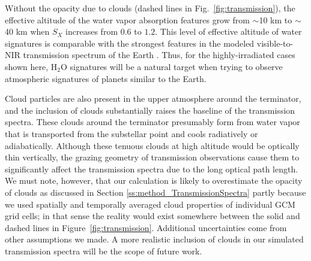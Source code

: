 \documentclass[11pt,numberedappendix,twocolappendix,]{emulateapj}
\def\water{H$_2$O }
\newcommand{\dsa}[1]{{\color{blue}#1}}
\begin{document}
Without the opacity due to clouds (dashed lines in Fig.~\ref{fig:transmission}), the effective altitude of the water vapor absorption features grow from $\sim $10 km to $\sim $40 km when $S_X$ increases from $0.6$ to $1.2$. 
This level of effective altitude of water signatures is comparable with the strongest features in the modeled visible-to-NIR transmission spectrum of the Earth \citep[e.g.,][]{Kaltenegger2009}.
Thus, for the highly-irradiated cases shown here, \water signatures will be a natural target when trying to observe atmospheric signatures of planets similar to the Earth. 

Cloud particles are also present in the upper atmosphere around the terminator, and the inclusion of clouds substantially raises the baseline of the transmission spectra. 
%
These clouds around the terminator presumably form from water vapor that is transported from the substellar point and cools radiatively or adiabatically. 
%
%
Although these tenuous clouds at high altitude would be optically thin vertically, the grazing geometry of transmission observations cause them to significantly affect the transmission spectra due to the long optical path length. 
We must note, however, that our calculation is likely to overestimate the opacity of clouds as discussed in Section \ref{ss:method_TransmissionSpectra} partly because we used spatially and temporally averaged cloud properties of individual GCM grid cells; in that sense the reality would exist somewhere between the solid and dashed lines in Figure~\ref{fig:transmission}.
Additional uncertainties come from other assumptions we made. 
A more realistic inclusion of clouds in our simulated transmission spectra will be the scope of future work. 
\end{document}
